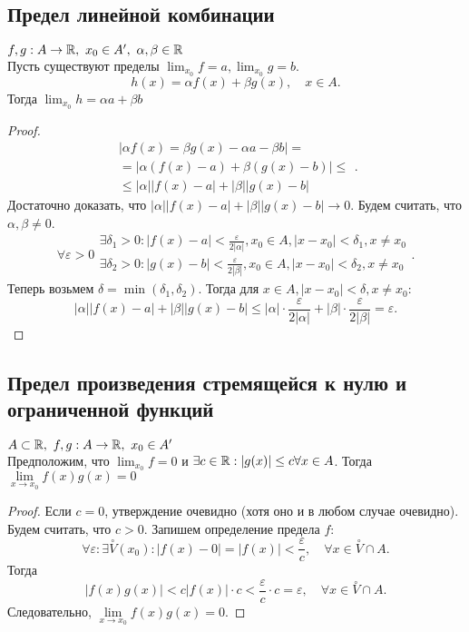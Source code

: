 \documentclass[12pt]{report}
\begin{document}
\subsection{Предел линейной комбинации}\label{ques_20}
\begin{thm}
    $f, g : A \to \mathbb{R}, ~x_0 \in A' , ~ \alpha , \beta \in \mathbb{R}$\\
    Пусть существуют пределы $\lim_{x_0} f = a, \lim_{x_0} g = b$. 
    \[
	h(x) = \alpha  f(x) +\beta g(x) , \quad x \in A
    .\] 
    Тогда $\lim_{x_0} h = \alpha a +\beta b$
\end{thm}
\begin{proof}
    \[
	\begin{array}{c}
	|\alpha f(x) =\beta g(x) -\alpha a -\beta b| =\\
	=|\alpha (f(x) -a) + \beta (g(x) -b)| \le \\
	\le |\alpha ||f(x) - a| + |\beta ||g(x) -b|
	\end{array}
    .\] 
    Достаточно доказать, что $
	|\alpha ||f(x) - a| + |\beta ||g(x) -b| \to  0
    $.  Будем считать, что $\alpha , \beta \ne 0$.
    \[
	\forall \varepsilon > 0
	\begin{array}{c}
	    \exists \delta_1 >0: |f(x) - a| < \frac{\varepsilon}{2|\alpha |}, x_0 \in A, |x-x_0|<\delta_1, x\ne x_0\\
	    \exists \delta_2 >0: |g(x) - b| < \frac{\varepsilon}{2|\beta |}, x_0 \in A, |x-x_0|<\delta_2 , x \ne x_0
    \end{array}
    .\] 
    Теперь возьмем $\delta = \min(\delta_1, \delta_2)$. Тогда для $x \in A, |x-x_0|<\delta , x\ne x_0:$ 
    \[
	|\alpha ||f(x) -a| +|\beta ||g(x)-b| \le |\alpha |\cdot \frac{\varepsilon}{2 |\alpha| } + |\beta |\cdot \frac{\varepsilon}{2 |\beta |} = \varepsilon 
    .\] 
\end{proof}
\subsection{Предел произведения стремящейся к нулю и ограниченной функций}\label{ques_21}
\begin{st}\label{lim_0_const}
    $A \subset \mathbb{R}, ~f, g: A \to \mathbb{R}, ~ x_0 \in A' $\\
    Предположим, что $\lim _{x_0} f = 0$ и $\exists c \in \mathbb{R} : |g(x)| \le  c \forall x \in A$. Тогда $\lim\limits_{x \to x_0} f(x)g(x) = 0$
\end{st}
\begin{proof}
    Если $c = 0$, утверждение очевидно (хотя оно и в любом случае очевидно).
    Будем считать, что $c >0$. Запишем определение предела $f$: \[
	\forall \varepsilon : \exists \stackrel \circ V(x_0) : |f(x) - 0| = |f(x)| < \frac{\varepsilon}{c}, \quad \forall x \in \stackrel \circ V \cap A
    .\] 
    Тогда \[
	|f(x)g(x)|< c |f(x)| \cdot c < \frac{\varepsilon}{c} \cdot c = \varepsilon , \quad \forall x \in \stackrel \circ V \cap A
    .\] 
    Следовательно,  $\lim\limits_{x \to x_0} f(x)g(x) = 0$.
\end{proof}
\end{document}
